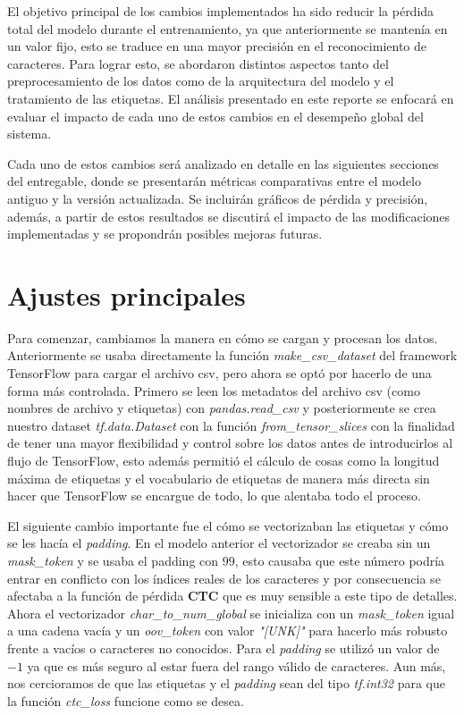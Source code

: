 \documentclass[10pt]{article}
\begin{document}
	El objetivo principal de los cambios implementados ha sido reducir la pérdida total del modelo durante el entrenamiento, ya que anteriormente se mantenía en un valor fijo, esto se traduce en una mayor precisión en el reconocimiento de caracteres. Para lograr esto, se abordaron distintos aspectos tanto del preprocesamiento de los datos como de la arquitectura del modelo y el tratamiento de las etiquetas. El análisis presentado en este reporte se enfocará en evaluar el impacto de cada uno de estos cambios en el desempeño global del sistema.
	
	Cada uno de estos cambios será analizado en detalle en las siguientes secciones del entregable, donde se presentarán métricas comparativas entre el modelo antiguo y la versión actualizada. Se incluirán gráficos de pérdida y precisión, además, a partir de estos resultados se discutirá el impacto de las modificaciones implementadas y se propondrán posibles mejoras futuras.
	
	\section{Ajustes principales}
	Para comenzar, cambiamos la manera en cómo se cargan y procesan los datos. Anteriormente se usaba directamente la función \textit{make\_csv\_dataset} del framework TensorFlow para cargar el archivo csv, pero ahora se optó por hacerlo de una forma más controlada. Primero se leen los metadatos del archivo csv (como nombres de archivo y etiquetas) con \textit{pandas.read\_csv} y posteriormente se crea nuestro dataset \textit{tf.data.Dataset} con la función \textit{from\_tensor\_slices} con la finalidad de tener una mayor flexibilidad y control sobre los datos antes de introducirlos al flujo de TensorFlow, esto además permitió el cálculo de cosas como la longitud máxima de etiquetas y el vocabulario de etiquetas de manera más directa sin hacer que TensorFlow se encargue de todo, lo que alentaba todo el proceso.
	
	El siguiente cambio importante fue el cómo se vectorizaban las etiquetas y cómo se les hacía el \textit{padding}. En el modelo anterior el vectorizador se creaba sin un \textit{mask\_token} y se usaba el padding con $99$, esto causaba que este número podría entrar en conflicto con los índices reales de los caracteres y por consecuencia se afectaba a la función de pérdida \textbf{CTC} que es muy sensible a este tipo de detalles. Ahora el vectorizador \textit{char\_to\_num\_global} se inicializa con un \textit{mask\_token} igual a una cadena vacía y un \textit{oov\_token} con valor \textit{"[UNK]"} para hacerlo más robusto frente a vacíos o caracteres no conocidos. Para el \textit{padding} se utilizó un valor de $-1$ ya que es más seguro al estar fuera del rango válido de caracteres. Aun más, nos cercioramos de que las etiquetas y el \textit{padding} sean del tipo \textit{tf.int32} para que la función \textit{ctc\_loss} funcione como se desea.
	
\end{document}
